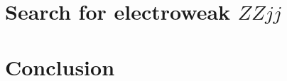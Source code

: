 \documentclass{PoS}
\begin{document}
\section{Search for electroweak $ZZjj$}
\label{sec:ewk}


\section{Conclusion}
\label{sec:conclusion}




\end{document}
